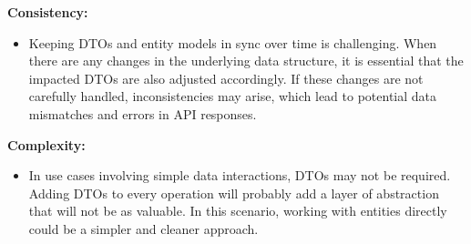     \textbf{Consistency:}
    \begin{itemize}
        \item Keeping DTOs and entity models in sync over time is challenging. When there are any changes in the underlying data structure, it is essential that the impacted DTOs are also adjusted accordingly. If these changes are not carefully handled, inconsistencies may arise, which lead to potential data mismatches and errors in API responses.
    \end{itemize}
    \textbf{Complexity:}
    \begin{itemize}
        \item In use cases involving simple data interactions, DTOs may not be required. Adding DTOs to every operation will probably add a layer of abstraction that will not be as valuable. In this scenario, working with entities directly could be a simpler and cleaner approach.
    \end{itemize} \Autocite{Andi:DTOs}